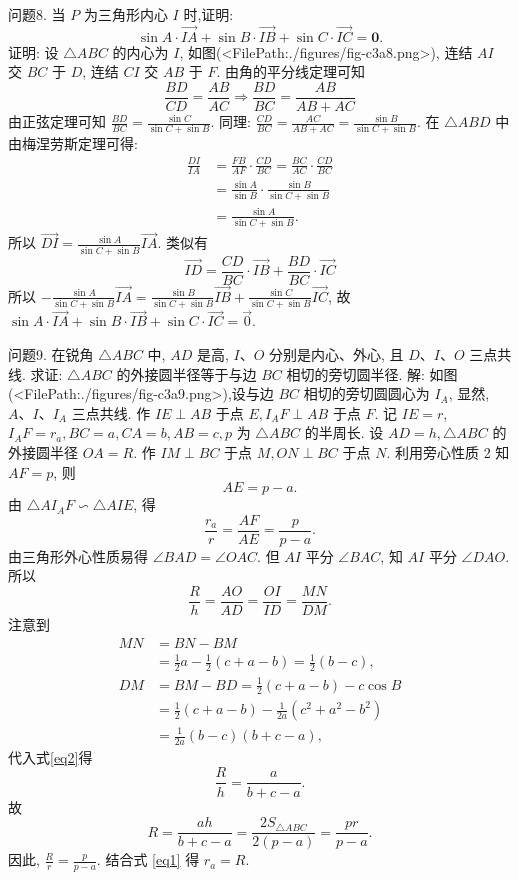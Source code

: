 问题8. 当 $P$ 为三角形内心 $I$ 时,证明:
$$
\sin A \cdot \overrightarrow{I A}+\sin B \cdot \overrightarrow{I B}+\sin C \cdot \overrightarrow{I C}=\mathbf{0} .
$$
证明: 设 $\triangle A B C$ 的内心为 $I$, 如图(<FilePath:./figures/fig-c3a8.png>), 连结 $A I$ 交 $B C$ 于 $D$, 连结 $C I$ 交 $A B$ 于 $F$.
由角的平分线定理可知
$$
\frac{B D}{C D}=\frac{A B}{A C} \Rightarrow \frac{B D}{B C}=\frac{A B}{A B+A C}
$$
由正弦定理可知 $\frac{B D}{B C}=\frac{\sin C}{\sin C+\sin B}$.
同理: $\frac{C D}{B C}=\frac{A C}{A B+A C}=\frac{\sin B}{\sin C+\sin B}$.
在 $\triangle A B D$ 中由梅涅劳斯定理可得:
$$
\begin{aligned}
\frac{D I}{I A} & =\frac{F B}{A F} \cdot \frac{C D}{B C}=\frac{B C}{A C} \cdot \frac{C D}{B C} \\
& =\frac{\sin A}{\sin B} \cdot \frac{\sin B}{\sin C+\sin B} \\
& =\frac{\sin A}{\sin C+\sin B} .
\end{aligned}
$$
所以 $\overrightarrow{D I}=\frac{\sin A}{\sin C+\sin B} \overrightarrow{I A}$.
类似有
$$
\overrightarrow{I D}=\frac{C D}{B C} \cdot \overrightarrow{I B}+\frac{B D}{B C} \cdot \overrightarrow{I C}
$$
所以 $-\frac{\sin A}{\sin C+\sin B} \overrightarrow{I A}=\frac{\sin B}{\sin C+\sin B} \overrightarrow{I B}+\frac{\sin C}{\sin C+\sin B} \overrightarrow{I C}$,
故 $\sin A \cdot \overrightarrow{I A}+\sin B \cdot \overrightarrow{I B}+\sin C \cdot \overrightarrow{I C}=\overrightarrow{0}$.



问题9. 在锐角 $\triangle A B C$ 中, $A D$ 是高, $I 、 O$ 分别是内心、外心, 且 $D 、 I 、 O$ 三点共线.
求证: $\triangle A B C$ 的外接圆半径等于与边 $B C$ 相切的旁切圆半径.
解: 如图(<FilePath:./figures/fig-c3a9.png>),设与边 $B C$ 相切的旁切圆圆心为 $I_A$, 显然, $A 、 I 、 I_A$ 三点共线.
作 $I E \perp A B$ 于点 $E, I_A F \perp A B$ 于点 $F$. 记 $I E=r$, $I_A F=r_a, B C=a, C A=b, A B=c, p$ 为 $\triangle A B C$ 的半周长.
设 $A D=h, \triangle A B C$ 的外接圆半径 $O A=R$. 作 $I M \perp B C$ 于点 $M, O N \perp B C$ 于点 $N$.
利用旁心性质 2 知 $A F=p$, 则
$$
A E=p-a .
$$
由 $\triangle A I_A F \backsim \triangle A I E$, 得
$$
\frac{r_a}{r}=\frac{A F}{A E}=\frac{p}{p-a} . \label{eq1}
$$
由三角形外心性质易得 $\angle B A D=\angle O A C$. 但 $A I$ 平分 $\angle B A C$, 知 $A I$ 平分
$\angle D A O$. 所以
$$
\frac{R}{h}=\frac{A O}{A D}=\frac{O I}{I D}=\frac{M N}{D M} . \label{eq2}
$$
注意到
$$
\begin{aligned}
M N & =B N-B M \\
& =\frac{1}{2} a-\frac{1}{2}(c+a-b)=\frac{1}{2}(b-c), \\
D M & =B M-B D=\frac{1}{2}(c+a-b)-c \cos B \\
& =\frac{1}{2}(c+a-b)-\frac{1}{2 a}\left(c^2+a^2-b^2\right) \\
& =\frac{1}{2 a}(b-c)(b+c-a),
\end{aligned}
$$
代入式\ref{eq2}得
$$
\frac{R}{h}=\frac{a}{b+c-a} .
$$
故
$$
R=\frac{a h}{b+c-a}=\frac{2 S_{\triangle A B C}}{2(p-a)}=\frac{p r}{p-a} .
$$
因此, $\frac{R}{r}=\frac{p}{p-a}$. 结合式 \ref{eq1} 得 $r_a=R$.



